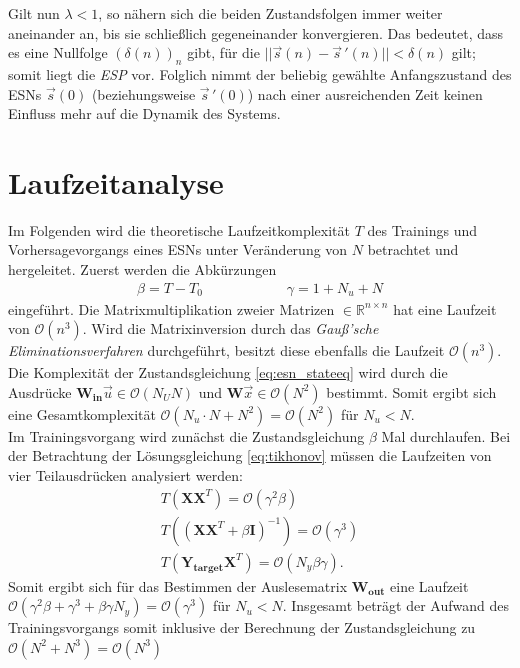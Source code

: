 \begin{appendices}
Gilt nun $\lambda < 1$, so nähern sich die beiden Zustandsfolgen immer weiter aneinander an, bis sie schließlich gegeneinander konvergieren. Das bedeutet, dass es eine Nullfolge $(\delta(n))_n$ gibt, für die $||\vec{s}(n) - \vec{s}\,'(n)|| < \delta(n)$ gilt; somit liegt die \textit{ESP} vor. Folglich nimmt der beliebig gewählte Anfangszustand des \textsc{ESN}s $\vec{s}(0)$ (beziehungsweise $\vec{s}\,'(0)$) nach einer ausreichenden Zeit keinen Einfluss mehr auf die Dynamik des Systems.

\section{Laufzeitanalyse}
\label{sc:apx_runtime_complexity}
Im Folgenden wird die theoretische Laufzeitkomplexität $T$ des Trainings und Vorhersagevorgangs eines \textsc{ESN}s unter Veränderung von $N$ betrachtet und hergeleitet.
Zuerst werden die Abkürzungen
\begin{align*}
\beta = T-T_{0} \qquad\qquad\qquad \gamma = 1+N_u+N
\end{align*}
eingeführt. Die Matrixmultiplikation zweier Matrizen $\in \mathbb{R}^{n \times n}$ hat eine Laufzeit von $\mathcal{O}(n^3)$. Wird die Matrixinversion durch das \textit{Gauß'sche Eliminationsverfahren} durchgeführt, besitzt diese ebenfalls die Laufzeit $\mathcal{O}(n^3)$.\\
Die Komplexität der Zustandsgleichung \ref{eq:esn_stateeq} wird durch die Ausdrücke $\mathbf{W_{in}} \vec{u} \in \mathcal{O}(N_U N)$ und $\mathbf{W}\vec{x} \in \mathcal{O}(N^2)$ bestimmt. Somit ergibt sich eine Gesamtkomplexität $\mathcal{O}(N_u \cdot N + N^2) = \mathcal{O}(N^2)$ für $N_u < N$.\\

Im Trainingsvorgang wird zunächst die Zustandsgleichung $\beta$ Mal durchlaufen. Bei der Betrachtung der Lösungsgleichung \ref{eq:tikhonov} müssen die Laufzeiten von vier Teilausdrücken analysiert werden:
\begin{align*}
T\left(\mathbf{X}\mathbf{X}^T \right) = \mathcal{O}(\gamma^2 \beta) \\
T\left((\mathbf{X}\mathbf{X}^T+\beta \mathbf{I})^{-1} \right) = \mathcal{O}(\gamma^{3}) \\
T\left(\mathbf{Y_{target}}\mathbf{X}^T \right) = \mathcal{O}(N_y \beta \gamma).
\end{align*}
Somit ergibt sich für das Bestimmen der Auslesematrix $\mathbf{W_{out}}$ eine Laufzeit $\mathcal{O}(\gamma^2 \beta + \gamma^{3} + \beta \gamma N_y) = \mathcal{O}(\gamma^{3})$  für $N_u < N$.
Insgesamt beträgt der Aufwand des Trainingsvorgangs somit inklusive der Berechnung der Zustandsgleichung zu $\mathcal{O}(N^2 + N^{3}) = \mathcal{O}(N^{3})$\\


\end{appendices}
